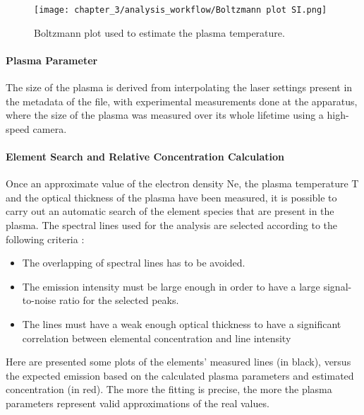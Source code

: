 \begin{figure}[H]
    \centering
    \texttt{[image: chapter\_3/analysis\_workflow/Boltzmann plot SI.png]} 
    \caption{Boltzmann plot used to estimate the plasma temperature. }
    \label{fig:boltzmann_plot}
\end{figure}


\paragraph{Plasma Parameter}
\label{par:plasma_parameter}
The size of the plasma is derived from interpolating the laser settings present in the metadata of the file, with experimental measurements done at the apparatus, where the size of the plasma was measured over its whole lifetime using a high-speed camera.

\paragraph{Element Search and Relative Concentration Calculation}
Once an approximate value of the electron density Ne, the plasma temperature T and the optical thickness of the plasma have been measured, it is possible to carry out an automatic search of the element species that are present in the plasma. 
The spectral lines used for the analysis are selected according to the following criteria \cite{gerhardQuantitativeAnalysesGlass2014}:
\begin{itemize}
    \item The overlapping of spectral lines has to be avoided.
    \item The emission intensity must be large enough in order to have a large signal-to-noise ratio for the selected peaks.
    \item The lines must have a weak enough optical thickness to have a significant correlation between elemental concentration and line intensity
\end{itemize}

Here are presented some plots of the elements' measured lines (in black), versus the expected emission based on the calculated plasma parameters and estimated concentration (in red). The more the fitting is precise, the more the plasma parameters represent valid approximations of the real values.

